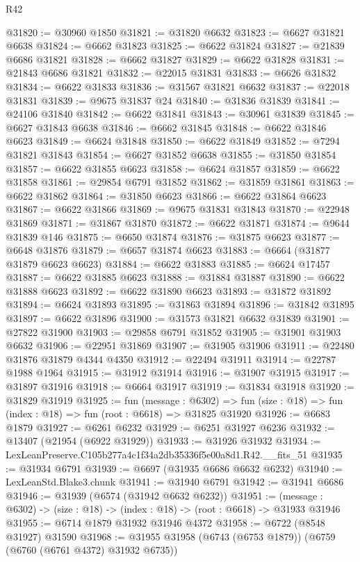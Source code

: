 \begin{lexlean}{R42}
\begin{coremodule}
{@31820 := @30960 @1850
@31821 := @31820 @6632
@31823 := @6627 @31821 @6638
@31824 := @6662 @31823
@31825 := @6622 @31824
@31827 := @21839 @6686 @31821
@31828 := @6662 @31827
@31829 := @6622 @31828
@31831 := @21843 @6686 @31821
@31832 := @22015 @31831
@31833 := @6626 @31832
@31834 := @6622 @31833
@31836 := @31567 @31821 @6632
@31837 := @22018 @31831
@31839 := @9675 @31837 @24
@31840 := @31836 @31839
@31841 := @24106 @31840
@31842 := @6622 @31841
@31843 := @30961 @31839
@31845 := @6627 @31843 @6638
@31846 := @6662 @31845
@31848 := @6622 @31846 @6623
@31849 := @6624 @31848
@31850 := @6622 @31849
@31852 := @7294 @31821 @31843
@31854 := @6627 @31852 @6638
@31855 := @31850 @31854
@31857 := @6622 @31855 @6623
@31858 := @6624 @31857
@31859 := @6622 @31858
@31861 := @29854 @6791 @31852
@31862 := @31859 @31861
@31863 := @6622 @31862
@31864 := @31850 @6623
@31866 := @6622 @31864 @6623
@31867 := @6622 @31866
@31869 := @9675 @31831 @31843
@31870 := @22948 @31869
@31871 := @31867 @31870
@31872 := @6622 @31871
@31874 := @9644 @31839 @146
@31875 := @6650 @31874
@31876 := @31875 @6623
@31877 := @6648 @31876
@31879 := @6657 @31874 @6623
@31883 := @6664 (@31877 @31879 @6623 @6623)
@31884 := @6622 @31883
@31885 := @6624 @17457
@31887 := @6622 @31885 @6623
@31888 := @31884 @31887
@31890 := @6622 @31888 @6623
@31892 := @6622 @31890 @6623
@31893 := @31872 @31892
@31894 := @6624 @31893
@31895 := @31863 @31894
@31896 := @31842 @31895
@31897 := @6622 @31896
@31900 := @31573 @31821 @6632 @31839
@31901 := @27822 @31900
@31903 := @29858 @6791 @31852
@31905 := @31901 @31903 @6632
@31906 := @22951 @31869
@31907 := @31905 @31906
@31911 := @22480 @31876 @31879 @4344 @4350
@31912 := @22494 @31911
@31914 := @22787 @1988 @1964
@31915 := @31912 @31914
@31916 := @31907 @31915
@31917 := @31897 @31916
@31918 := @6664 @31917
@31919 := @31834 @31918
@31920 := @31829 @31919
@31925 := fun (message : @6302) =>
  fun (size : @18) => fun (index : @18) => fun (root : @6618) => @31825 @31920
@31926 := @6683 @1879
@31927 := @6261 @6232
@31929 := @6251 @31927 @6236
@31932 := @13407 (@21954 (@6922 @31929))
@31933 := @31926 @31932
@31934 := LexLeanPreserve.C105b277a4c1f34a2db35336f5e00a8d1.R42.__fits_51
@31935 := @31934 @6791
@31939 := @6697 (@31935 @6686 @6632 @6232)
@31940 := LexLeanStd.Blake3.chunk
@31941 := @31940 @6791
@31942 := @31941 @6686
@31946 := @31939 (@6574 (@31942 @6632 @6232))
@31951 := (message : @6302) -> (size : @18) -> (index : @18) -> (root : @6618) -> @31933 @31946
@31955 := @6714 @1879 @31932 @31946 @4372
@31958 := @6722 (@8548 @31927) @31590
@31968 := @31955 @31958 (@6743 (@6753 @1879)) (@6759 (@6760 (@6761 @4372) @31932 @6735))
}
\end{coremodule}
\end{lexlean}
